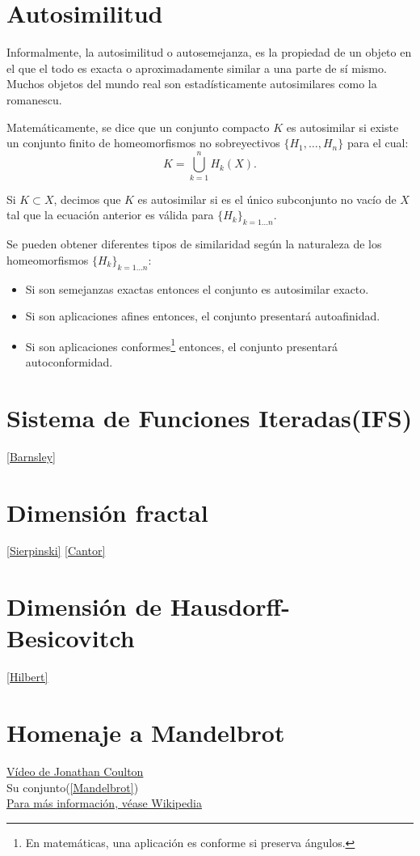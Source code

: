 \documentclass[a4paper, 11pt]{article} %
\begin{document}
\section{Autosimilitud}
	Informalmente, la autosimilitud o autosemejanza, es la propiedad de un objeto en el que el todo es exacta o aproximadamente similar a una parte de sí mismo. Muchos objetos del mundo real son estadísticamente autosimilares como la romanescu. %
	
	Matemáticamente, se dice que un conjunto compacto $K$ es autosimilar si existe un conjunto finito de homeomorfismos no sobreyectivos $\{H_1,\dots,H_n\}$ para el cual:
	\begin{equation*}
		K=\bigcup_{k=1}^n H_k(X).
	\end{equation*}
	
	Si $K \subset X$, decimos que $K$ es autosimilar si es el único subconjunto no vacío de $X$ tal que la ecuación anterior es válida para $\{ H_k \}_{k=1\dots n}$.
	
	Se pueden obtener diferentes tipos de similaridad según la naturaleza de los homeomorfismos $\{H_k\}_{k=1\dots n}$:
	
	\begin{itemize}
		\item Si son semejanzas exactas entonces el conjunto es autosimilar exacto.
		\item Si son aplicaciones afines entonces, el conjunto presentará autoafinidad.
		\item Si son aplicaciones conformes\footnote{En matemáticas, una aplicación es conforme si preserva ángulos.} entonces, el conjunto presentará autoconformidad.
	\end{itemize}
\section{Sistema de Funciones Iteradas(IFS)} \label{IFS}
\ref{Barnsley}
\section{Dimensión fractal}
\ref{Sierpinski} \ref{Cantor}
\section{Dimensión de Hausdorff-Besicovitch}
\ref{Hilbert}

\section{Homenaje a Mandelbrot} \label{Homenaje}
\href{https://www.youtube.com/watch?v=ES-yKOYaXq0}{Vídeo de Jonathan Coulton}\\
Su conjunto(\ref{Mandelbrot})\\
\href{http://es.wikipedia.org/wiki/Beno\%C3\%AEt_Mandelbrot}{Para más información, véase Wikipedia}
\end{document}
